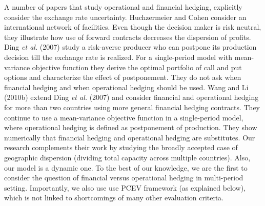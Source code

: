 \documentclass[mnsc,nonblindrev,copyedit]{informs2_wz} %
\begin{document}
A number of papers that study operational and financial hedging, explicitly consider the exchange rate uncertainty. Huchzermeier and Cohen \cite{Huchzermeier} consider an international network of facilities.  Even though the decision maker is risk neutral, they illustrate how use of forward contracts decreases the dispersion of profits.  Ding {\it et al.} (2007) study a risk-averse producer who can postpone its production decision till the exchange rate is realized. For a single-period model with mean-variance objective function they derive the optimal portfolio of call and put options and characterize the effect of postponement. 
They do not ask when financial hedging and when operational hedging should be used.
Wang and Li (2010b) extend Ding {\it et al.} (2007) and consider financial and operational hedging for more than two countries using more general financial hedging contracts.  They continue to use a mean-variance objective function in a single-period model, where operational hedging is defined as postponement of production. They show numerically that financial hedging and operational hedging are substitutes. Our research complements their work by studying the broadly accepted case of geographic dispersion (dividing total capacity across multiple countries).  Also, our model is a dynamic one. To the best of our knowledge, we are the first to consider the question of financial versus operational hedging in multi-period setting.  Importantly, we also use use PCEV framework (as explained below), which is not linked to shortcomings of many other evaluation criteria.  
\end{document}
